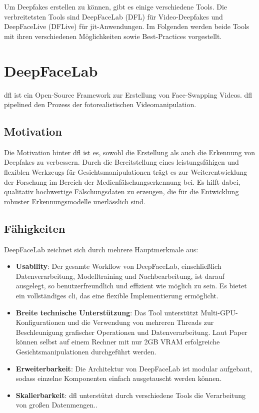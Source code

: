 Um Deepfakes erstellen zu können, gibt es einige verschiedene Tools.
Die verbreitetsten Tools sind DeepFaceLab (DFL) für Video-Deepfakes und DeepFaceLive (DFLive) für \gls{jit}-Anwendungen.
Im Folgenden werden beide Tools mit ihren verschiedenen Möglichkeiten sowie Best-Practices vorgestellt.

\section{DeepFaceLab}\label{sec:deepfacelab}
\gls{dfl} ist ein Open-Source Framework zur Erstellung von Face-Swapping Videos.
\gls{dfl} pipelined den Prozess der fotorealistischen Videomanipulation.

\subsection{Motivation}\label{subsec:motivation}
Die Motivation hinter \gls{dfl} ist es, sowohl die Erstellung als auch die Erkennung von Deepfakes zu verbessern.
Durch die Bereitstellung eines leistungsfähigen und flexiblen Werkzeugs für Gesichtsmanipulationen trägt es zur Weiterentwicklung der Forschung im Bereich der Medienfälschungserkennung bei.
Es hilft dabei, qualitativ hochwertige Fälschungsdaten zu erzeugen, die für die Entwicklung robuster Erkennungsmodelle unerlässlich sind\cite{deepfacelabintegratedflexibleextensible, deepfacelab}.

\subsection{Fähigkeiten}\label{subsec:fahigkeiten}
DeepFaceLab zeichnet sich durch mehrere Hauptmerkmale aus:
\begin{itemize}
    \item \textbf{Usability}: Der gesamte Workflow von DeepFaceLab, einschließlich Datenverarbeitung, Modelltraining und Nachbearbeitung, ist darauf ausgelegt, so benutzerfreundlich und effizient wie möglich zu sein.
     Es bietet ein vollständiges \gls{cli}, das eine flexible Implementierung ermöglicht.
    \item \textbf{Breite technische Unterstützung}: Das Tool unterstützt Multi-GPU-Konfigurationen und die Verwendung von mehreren Threads zur Beschleunigung grafischer Operationen und Datenverarbeitung.
     Laut Paper können selbst auf einem Rechner mit nur 2GB VRAM erfolgreiche Gesichtsmanipulationen durchgeführt werden\cite{deepfacelabintegratedflexibleextensible}.
    \item \textbf{Erweiterbarkeit}: Die Architektur von DeepFaceLab ist modular aufgebaut, sodass einzelne Komponenten einfach ausgetauscht werden können\cite{deepfacelabintegratedflexibleextensible}.
    \item \textbf{Skalierbarkeit}: \gls{dfl} unterstützt durch verschiedene Tools die Verarbeitung von großen Datenmengen.\cite{deepfacelabintegratedflexibleextensible}.
\end{itemize}

